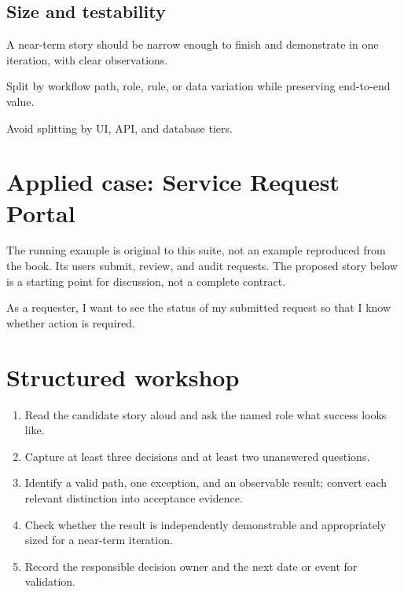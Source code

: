\documentclass[11pt,letterpaper]{article}
\begin{document}
\subsection{Size and testability}
A near-term story should be narrow enough to finish and demonstrate in one iteration, with clear observations.

\begin{tcolorbox}[colback=tealback,colframe=navy,title={Engineering translation},breakable]
Split by workflow path, role, rule, or data variation while preserving end-to-end value.

\end{tcolorbox}
\begin{tcolorbox}[colback=amberback,colframe=navy,title={Failure mode to watch},breakable]
Avoid splitting by UI, API, and database tiers.

\end{tcolorbox}
\section{Applied case: Service Request Portal}
The running example is original to this suite, not an example reproduced from the book. Its users submit, review, and audit requests. The proposed story below is a starting point for discussion, not a complete contract.

\begin{tcolorbox}[colback=blueback,colframe=navy,title={Candidate story},breakable]
As a requester, I want to see the status of my submitted request so that I know whether action is required.

\end{tcolorbox}
\section{Structured workshop}
\begin{enumerate}[leftmargin=*,itemsep=3pt]
\item Read the candidate story aloud and ask the named role what success looks like.
\item Capture at least three decisions and at least two unanswered questions.
\item Identify a valid path, one exception, and an observable result; convert each relevant distinction into acceptance evidence.
\item Check whether the result is independently demonstrable and appropriately sized for a near-term iteration.
\item Record the responsible decision owner and the next date or event for validation.
\end{enumerate}
\end{document}
